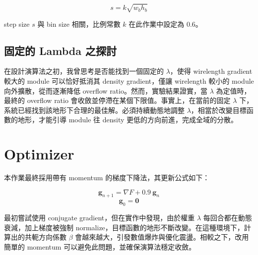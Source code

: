 \documentclass[12pt]{article}
\begin{document}
$$s = k\sqrt{w_bh_b}$$

step size $s$ 與 bin size 相關，比例常數 $k$ 在此作業中設定為 0.6。

\subsection{固定的 Lambda 之探討}

在設計演算法之初，我曾思考是否能找到一個固定的 $\lambda$，使得 wirelength gradient 較大的 module 可以恰好抵消其 density gradient，僅讓 wirelength 較小的 module 向外擴散，從而逐漸降低 overflow ratio。然而，實驗結果證實，當 $\lambda$ 為定值時，最終的 overflow ratio 會收斂並停滯在某個下限值。事實上，在當前的固定 $\lambda$ 下，系統已經找到該地形下合理的最佳解。必須持續動態地調整 $\lambda$，相當於改變目標函數的地形，才能引導 module 往 density 更低的方向前進，完成全域的分散。

\section{Optimizer}

本作業最終採用帶有 momentum 的梯度下降法，其更新公式如下：

$$\mathbf g_{n+1} = \nabla F + 0.9\ \mathbf g_{n}$$
$$\mathbf g_{0} = \mathbf 0$$

最初嘗試使用 conjugate gradient，但在實作中發現，由於權重 $\lambda$ 每回合都在動態衰減，加上梯度被強制 normalize，目標函數的地形不斷改變。在這種環境下，計算出的共軛方向係數 $\beta$ 會越來越大，引發數值爆炸與優化震盪。相較之下，改用簡單的 momentum 可以避免此問題，並確保演算法穩定收斂。
\end{document}
